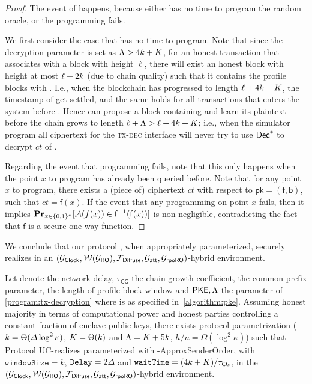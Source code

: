 \begin{proof}
	The event of \badDec happens, because either \simulator has no time to program the random oracle, or the programming fails.

	We first consider the case that \simulator has no time to program.
	Note that since the decryption parameter is set as $\Lambda > 4k + K$, for an honest transaction \tx that associates with a block with height $\ell$, there will exist an honest block with height at most $\ell + 2k$ (due to chain quality) such that it contains the profile blocks with \tx.
	I.e., when the blockchain has progressed to length $\ell + 4k + K$, the timestamp of \tx get settled, and the same holds for all transactions that enters the system before \tx.
	Hence \simulator can propose a block containing \tx and learn its plaintext before the chain grows to length $\ell + \Lambda > \ell + 4k + K$; i.e., when the simulator program all ciphertext for \tx the \textsc{tx-dec} interface will never try to use $\mathsf{Dec}^\ast$ to decrypt $ct$ of \tx.

	Regarding the event that programming \funcGrpoRO fails, note that this only happens when the point $x$ to program has already been queried before.
	Note that for any point $x$ to program, there exists a (piece of) ciphertext $ct$ with respect to $\mathsf{pk} = (\mathsf{f}, \mathsf{b})$, such that $ct = \mathsf{f}(x)$.
	If the event that any programming on point $x$ fails, then it implies $\mathbf{Pr}_{x \in\{0 ,1\}^\kappa}[\mathcal{A}(f(x)) \in \mathsf{f}^{-1}(\mathsf{f}(x))]$ is non-negligible, contradicting the fact that $\mathsf{f}$ is a secure one-way function.
\end{proof}

We conclude that our protocol \protocFairLedger, when appropriately parameterized, securely realizes \funcFairLedger in an $(\mathcal{G}_{\mathsf{Clock}},\allowbreak \mathcal{W}(\mathcal{G}_{\mathsf{RO}}),\allowbreak \mathcal{F}_{\mathsf{Diffuse}},\allowbreak \mathcal{G}_{\mathsf{att}},\allowbreak \mathcal{G}_{\mathsf{rpoRO}})$-hybrid environment.

\begin{theorem}
	Let \delay denote the network delay, $\tau_{\mathsf{CG}}$ the chain-growth coefficient, \CPLen the common prefix parameter, \PBWindowLen the length of profile block window and $\mathsf{PKE}, \Lambda$ the parameter of \cref{program:tx-decryption} where \PKE is as specified in~\cref{algorithm:pke}.
	Assuming honest majority in terms of computational power and honest parties controlling a constant fraction of enclave public keys, there exists protocol parametrization ($k = \Theta(\varDelta \log^2 \kappa)$, $K = \Theta(k)$ and $\Lambda = K + 5k$, $h / n = \Omega(\log^2 \kappa)$) such that Protocol \protocFairLedger UC-realizes \funcFairLedger parameterized with \delay-\textsf{ApproxSenderOrder}, with $\mathtt{windowSize} = k$, $\mathtt{Delay} = 2\varDelta$ and $\mathtt{waitTime} = (4k + K) / \tau_{\mathsf{CG}}$, in the $(\mathcal{G}_{\mathsf{Clock}},\allowbreak \mathcal{W}(\mathcal{G}_{\mathsf{RO}}),\allowbreak \mathcal{F}_{\mathsf{Diffuse}},\allowbreak \mathcal{G}_{\mathsf{att}},\allowbreak \mathcal{G}_{\mathsf{rpoRO}})$-hybrid environment.
\end{theorem}


